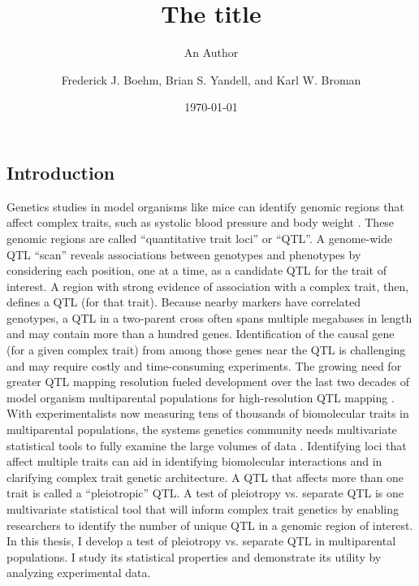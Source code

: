 \documentclass[oneside]{book}\usepackage[]{graphicx}\usepackage[]{color}
\title{The title}
\author{An Author}
\title{}
\author{Frederick J. Boehm, Brian S. Yandell, and Karl W. Broman}
\date{\today}
\begin{document}
\doublespacing
\begin{titlepage}\thispagestyle{empty}
\tableofcontents
\chapter{Introduction}

Genetics studies in model organisms like mice can identify
genomic regions that affect complex traits, such as systolic blood pressure and body weight \citep{sax1923association,soller1976power,lander1989mapping,broman2009guide,jansen2007quantitative}. These genomic regions are called ``quantitative trait loci'' or ``QTL''.
A genome-wide QTL ``scan'' reveals
associations between genotypes and phenotypes by considering each position,
one at a time, as a candidate QTL for the trait of interest.
A region with strong evidence of association with a complex trait, then, defines a QTL (for that trait).
Because nearby markers have correlated
genotypes, a QTL in a two-parent cross often spans multiple megabases in length
and may contain more than a hundred genes.
Identification of the causal gene (for a given complex trait) from among those genes near the QTL is
challenging and may require costly and time-consuming experiments.
The growing need for greater QTL mapping resolution fueled development over the
last two decades of model organism multiparental populations for high-resolution QTL mapping \citep{de2017back,churchill2004collaborative,svenson2012high,huang2012multiparent,shivakumar2018soybean,huang2011analysis,kover2009multiparent,tisne2017identification,stanley2017genetic}.
With experimentalists now measuring tens of thousands of biomolecular traits
in multiparental populations, the systems genetics community needs multivariate
statistical tools to fully examine the large volumes of data \citep{keller2018genetic,chick2016defining}.
Identifying loci that affect multiple traits can aid in identifying biomolecular interactions and in clarifying complex trait genetic architecture. A QTL that affects more than one trait is called a ``pleiotropic'' QTL.
A test of pleiotropy vs. separate QTL is one multivariate statistical tool that will inform
complex trait genetics by enabling researchers to identify the number of
unique QTL in a genomic region of interest.
In this thesis, I develop a test of pleiotropy vs. separate QTL in multiparental
populations. I study its statistical properties and demonstrate its utility
by analyzing experimental data.







\end{titlepage}
\end{document}
